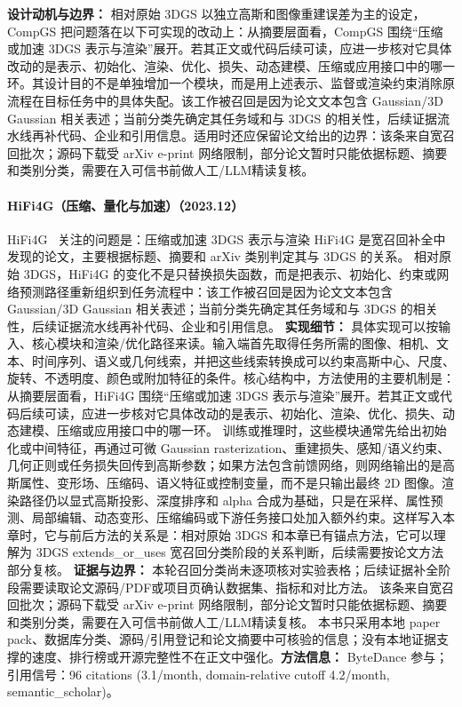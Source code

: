 \textbf{设计动机与边界：} 相对原始 3DGS 以独立高斯和图像重建误差为主的设定，CompGS 把问题落在以下可实现的改动上：从摘要层面看，CompGS 围绕“压缩或加速 3DGS 表示与渲染”展开。若其正文或代码后续可读，应进一步核对它具体改动的是表示、初始化、渲染、优化、损失、动态建模、压缩或应用接口中的哪一环。其设计目的不是单独增加一个模块，而是用上述表示、监督或渲染约束消除原流程在目标任务中的具体失配。该工作被召回是因为论文文本包含 Gaussian/3D Gaussian 相关表述；当前分类先确定其任务域和与 3DGS 的相关性，后续证据流水线再补代码、企业和引用信息。适用时还应保留论文给出的边界：该条来自宽召回批次；源码下载受 arXiv e-print 网络限制，部分论文暂时只能依据标题、摘要和类别分类，需要在入可信书前做人工/LLM精读复核。
\paragraph{HiFi4G（压缩、量化与加速）（2023.12）}
HiFi4G~\cite{2312_03461} 关注的问题是：压缩或加速 3DGS 表示与渲染 HiFi4G 是宽召回补全中发现的论文，主要根据标题、摘要和 arXiv 类别判定其与 3DGS 的关系。
相对原始 3DGS，HiFi4G 的变化不是只替换损失函数，而是把表示、初始化、约束或网络预测路径重新组织到任务流程中：该工作被召回是因为论文文本包含 Gaussian/3D Gaussian 相关表述；当前分类先确定其任务域和与 3DGS 的相关性，后续证据流水线再补代码、企业和引用信息。
\textbf{实现细节：} 具体实现可以按输入、核心模块和渲染/优化路径来读。输入端首先取得任务所需的图像、相机、文本、时间序列、语义或几何线索，并把这些线索转换成可以约束高斯中心、尺度、旋转、不透明度、颜色或附加特征的条件。核心结构中，方法使用的主要机制是：从摘要层面看，HiFi4G 围绕“压缩或加速 3DGS 表示与渲染”展开。若其正文或代码后续可读，应进一步核对它具体改动的是表示、初始化、渲染、优化、损失、动态建模、压缩或应用接口中的哪一环。 训练或推理时，这些模块通常先给出初始化或中间特征，再通过可微 Gaussian rasterization、重建损失、感知/语义约束、几何正则或任务损失回传到高斯参数；如果方法包含前馈网络，则网络输出的是高斯属性、变形场、压缩码、语义特征或控制变量，而不是只输出最终 2D 图像。渲染路径仍以显式高斯投影、深度排序和 alpha 合成为基础，只是在采样、属性预测、局部编辑、动态变形、压缩编码或下游任务接口处加入额外约束。这样写入本章时，它与前后方法的关系是：相对原始 3DGS 和本章已有锚点方法，它可以理解为 3DGS extends\_or\_uses 宽召回分类阶段的关系判断，后续需要按论文方法部分复核。
\textbf{证据与边界：} 本轮召回分类尚未逐项核对实验表格；后续证据补全阶段需要读取论文源码/PDF或项目页确认数据集、指标和对比方法。 该条来自宽召回批次；源码下载受 arXiv e-print 网络限制，部分论文暂时只能依据标题、摘要和类别分类，需要在入可信书前做人工/LLM精读复核。 本书只采用本地 paper pack、数据库分类、源码/引用登记和论文摘要中可核验的信息；没有本地证据支撑的速度、排行榜或开源完整性不在正文中强化。\textbf{方法信息：} ByteDance 参与；引用信号：96 citations (3.1/month, domain-relative cutoff 4.2/month, semantic\_scholar)。
